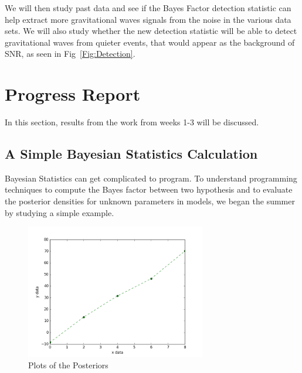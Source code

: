 \documentclass{article}
\begin{document}
 We will then study past data and see if the Bayes Factor detection statistic can help extract more gravitational waves signals from the noise in the various data sets. We will also study whether the new detection statistic will be able to detect gravitational waves from quieter events, that would appear as the background of SNR, as seen in Fig~\ref{Fig:Detection}.
 
 
 \section{Progress Report}
 
 In this section, results from the work from weeks 1-3 will be discussed.
 
 \subsection{A Simple Bayesian Statistics Calculation}
 
 Bayesian Statistics can get complicated to program. To understand programming techniques to compute the Bayes factor between two hypothesis and to evaluate the posterior densities for unknown parameters in models, we began the summer by studying a simple example. \\
 
 \begin{figure}[h]
 	\centering 	\includegraphics[width=0.7\textwidth]{Figures/rawData.png} 
 	\caption{Plots of the Posteriors}
 	\label{Fig:origData}
 \end{figure}
 
\end{document}
